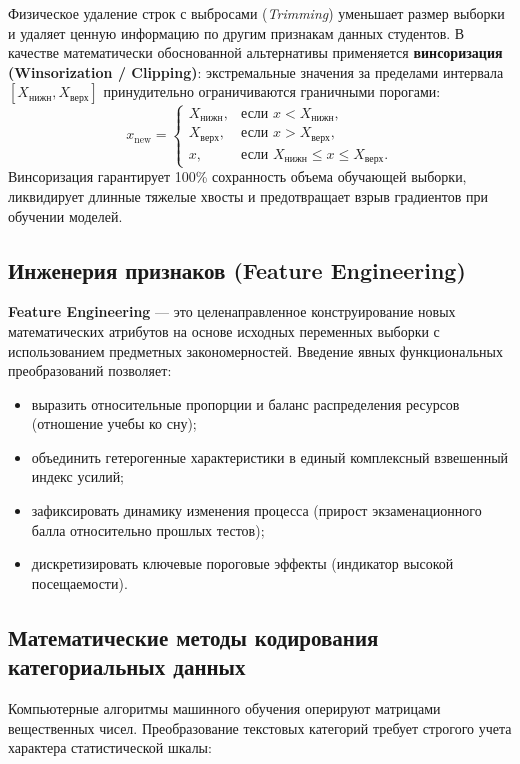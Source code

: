 \documentclass[14pt,a4paper]{extarticle}
\begin{document}
Физическое удаление строк с выбросами (\textit{Trimming}) уменьшает размер выборки и удаляет ценную информацию по другим признакам данных студентов. В качестве математически обоснованной альтернативы применяется \textbf{винсоризация (Winsorization / Clipping)}: экстремальные значения за пределами интервала $[X_{\text{нижн}}, X_{\text{верх}}]$ принудительно ограничиваются граничными порогами:
\begin{equation}
    x_{\text{new}} = 
    \begin{cases}
        X_{\text{нижн}}, & \text{если } x < X_{\text{нижн}}, \\
        X_{\text{верх}}, & \text{если } x > X_{\text{верх}}, \\
        x, & \text{если } X_{\text{нижн}} \le x \le X_{\text{верх}}.
    \end{cases}
\end{equation}
Винсоризация гарантирует 100\% сохранность объема обучающей выборки, ликвидирует длинные тяжелые хвосты и предотвращает взрыв градиентов при обучении моделей.

\subsection{Инженерия признаков (Feature Engineering)}

\textbf{Feature Engineering} --- это целенаправленное конструирование новых математических атрибутов на основе исходных переменных выборки с использованием предметных закономерностей. Введение явных функциональных преобразований позволяет:
\begin{itemize}
    \item выразить относительные пропорции и баланс распределения ресурсов (отношение учебы ко сну);
    \item объединить гетерогенные характеристики в единый комплексный взвешенный индекс усилий;
    \item зафиксировать динамику изменения процесса (прирост экзаменационного балла относительно прошлых тестов);
    \item дискретизировать ключевые пороговые эффекты (индикатор высокой посещаемости).
\end{itemize}

\subsection{Математические методы кодирования категориальных данных}

Компьютерные алгоритмы машинного обучения оперируют матрицами вещественных чисел. Преобразование текстовых категорий требует строгого учета характера статистической шкалы:
\end{document}

